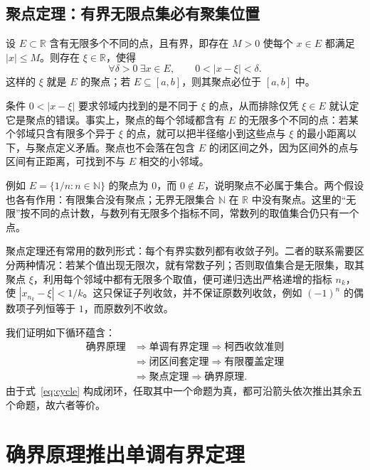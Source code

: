 \documentclass[UTF8,12pt,a4paper,fontset=fandol,oneside]{ctexart}
\begin{document}
\subsection{聚点定理：有界无限点集必有聚集位置}

\begin{theorem}[聚点定理]
  \label{thm:accumulation}
  设 $E\subset\mathbb R$ 含有无限多个不同的点，且有界，即存在 $M>0$ 使每个 $x\in E$ 都满足 $|x|\leq M$。则存在 $\xi\in\mathbb R$，使得
  \[
    \forall\delta>0\ \exists x\in E,
    \qquad 0<|x-\xi|<\delta.
  \]
  这样的 $\xi$ 就是 $E$ 的聚点；若 $E\subseteq[a,b]$，则其聚点必位于 $[a,b]$ 中。
\end{theorem}

条件 $0<|x-\xi|$ 要求邻域内找到的是不同于 $\xi$ 的点，从而排除仅凭 $\xi\in E$ 就认定它是聚点的错误。事实上，聚点的每个邻域都含有 $E$ 的无限多个不同的点：若某个邻域只含有限多个异于 $\xi$ 的点，就可以把半径缩小到这些点与 $\xi$ 的最小距离以下，与聚点定义矛盾。聚点也不会落在包含 $E$ 的闭区间之外，因为区间外的点与区间有正距离，可找到不与 $E$ 相交的小邻域。

例如 $E=\{1/n:n\in\mathbb N\}$ 的聚点为 $0$，而 $0\notin E$，说明聚点不必属于集合。两个假设也各有作用：有限集合没有聚点；无界无限集合 $\mathbb N$ 在 $\mathbb R$ 中没有聚点。这里的“无限”按不同的点计数，与数列有无限多个指标不同，常数列的取值集合仍只有一个点。

聚点定理还有常用的数列形式：每个有界实数列都有收敛子列。二者的联系需要区分两种情况：若某个值出现无限次，就有常数子列；否则取值集合是无限集，取其聚点 $\xi$，利用每个邻域中都有无限多个取值，便可递归选出严格递增的指标 $n_k$，使 $|x_{n_k}-\xi|<1/k$。这只保证子列收敛，并不保证原数列收敛，例如 $(-1)^n$ 的偶数项子列恒等于 $1$，而原数列不收敛。

我们证明如下循环蕴含：
\begin{equation}
  \begin{aligned}
    \text{确界原理}
    &\Longrightarrow \text{单调有界定理}
    \Longrightarrow \text{柯西收敛准则} \\
    &\Longrightarrow \text{闭区间套定理}
    \Longrightarrow \text{有限覆盖定理} \\
    &\Longrightarrow \text{聚点定理}
    \Longrightarrow \text{确界原理}.
  \end{aligned}
  \label{eq:cycle}
\end{equation}
由于式~\eqref{eq:cycle} 构成闭环，任取其中一个命题为真，都可沿箭头依次推出其余五个命题，故六者等价。

\section{确界原理推出单调有界定理}
\end{document}
